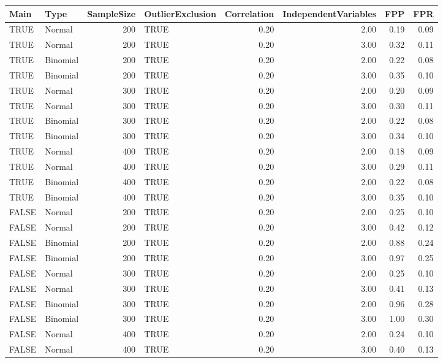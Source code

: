 \begin{table}[ht]
\centering
\begin{tabular}{llrlrrrr}
  \hline
Main & Type & SampleSize & OutlierExclusion & Correlation & IndependentVariables & FPP & FPR \\ 
  \hline
TRUE & Normal & 200 & TRUE & 0.20 & 2.00 & 0.19 & 0.09 \\ 
  TRUE & Normal & 200 & TRUE & 0.20 & 3.00 & 0.32 & 0.11 \\ 
  TRUE & Binomial & 200 & TRUE & 0.20 & 2.00 & 0.22 & 0.08 \\ 
  TRUE & Binomial & 200 & TRUE & 0.20 & 3.00 & 0.35 & 0.10 \\ 
  TRUE & Normal & 300 & TRUE & 0.20 & 2.00 & 0.20 & 0.09 \\ 
  TRUE & Normal & 300 & TRUE & 0.20 & 3.00 & 0.30 & 0.11 \\ 
  TRUE & Binomial & 300 & TRUE & 0.20 & 2.00 & 0.22 & 0.08 \\ 
  TRUE & Binomial & 300 & TRUE & 0.20 & 3.00 & 0.34 & 0.10 \\ 
  TRUE & Normal & 400 & TRUE & 0.20 & 2.00 & 0.18 & 0.09 \\ 
  TRUE & Normal & 400 & TRUE & 0.20 & 3.00 & 0.29 & 0.11 \\ 
  TRUE & Binomial & 400 & TRUE & 0.20 & 2.00 & 0.22 & 0.08 \\ 
  TRUE & Binomial & 400 & TRUE & 0.20 & 3.00 & 0.35 & 0.10 \\ 
  FALSE & Normal & 200 & TRUE & 0.20 & 2.00 & 0.25 & 0.10 \\ 
  FALSE & Normal & 200 & TRUE & 0.20 & 3.00 & 0.42 & 0.12 \\ 
  FALSE & Binomial & 200 & TRUE & 0.20 & 2.00 & 0.88 & 0.24 \\ 
  FALSE & Binomial & 200 & TRUE & 0.20 & 3.00 & 0.97 & 0.25 \\ 
  FALSE & Normal & 300 & TRUE & 0.20 & 2.00 & 0.25 & 0.10 \\ 
  FALSE & Normal & 300 & TRUE & 0.20 & 3.00 & 0.41 & 0.13 \\ 
  FALSE & Binomial & 300 & TRUE & 0.20 & 2.00 & 0.96 & 0.28 \\ 
  FALSE & Binomial & 300 & TRUE & 0.20 & 3.00 & 1.00 & 0.30 \\ 
  FALSE & Normal & 400 & TRUE & 0.20 & 2.00 & 0.24 & 0.10 \\ 
  FALSE & Normal & 400 & TRUE & 0.20 & 3.00 & 0.40 & 0.13 \\ 

\end{tabular}
\end{table}
